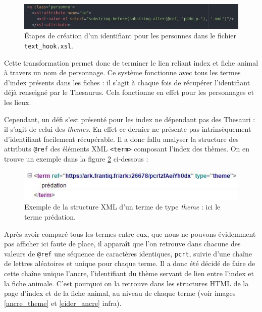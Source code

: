 \documentclass[a4paper,12pt,twoside]{book}
\begin{document}
\begin{figure}[H]
    \centering
    \includegraphics[width=12cm]{img/partie_3/id_pers.JPG}
    \caption{Étapes de création d'un identifiant pour les personnes dans le fichier \texttt{text\_hook.xsl}.}
    \label{id_pers}
\end{figure}

 Cette transformation permet donc de terminer le lien reliant index et fiche animal à travers un nom de personnage. Ce système fonctionne avec tous les termes d'index présents dans les fiches : il s'agit à chaque fois de récupérer l'identifiant déjà renseigné par le Thesaurus. Cela fonctionne en effet pour les personnages et les lieux. 

Cependant, un défi s'est présenté pour les index ne dépendant pas des Thesauri : il s'agit de celui des \textit{themes}. En effet ce dernier ne présente pas intrinsèquement d'identifiant facilement récupérable. Il a donc fallu analyser la structure des attributs \texttt{@ref} des éléments XML \texttt{<term>} composant l'index des thèmes. On en trouve un exemple dans la figure \ref{term} ci-dessous :

\begin{figure}[H]
    \centering
    \includegraphics[width=12cm]{img/partie_3/theme.JPG}
    \caption{Exemple de la structure XML d'un terme de type \textit{theme} : ici le terme prédation.}
    \label{term}
\end{figure}

Après avoir comparé tous les termes entre eux, que nous ne pouvons évidemment pas afficher ici faute de place, il apparaît que l'on retrouve dans chacune des valeurs de \texttt{@ref} une séquence de caractères identiques, \texttt{pcrt}, suivie d'une chaîne de lettres aléatoires et unique pour chaque terme. Il a donc été décidé de faire de cette chaîne unique l'ancre, l'identifiant du thème servant de lien entre l'index et la fiche animale. C'est pourquoi on la retrouve dans les structures \acrshort{HTML} de la page d'index et de la fiche animal, au niveau de chaque terme (voir images \ref{ancre_theme} et \ref{eider_ancre} infra).
\end{document}
